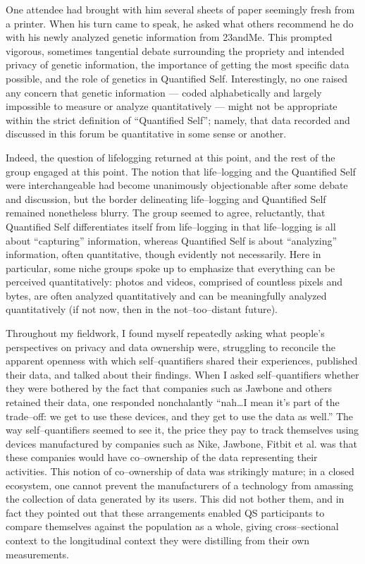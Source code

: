 \documentclass{article}
\begin{document}
One attendee had brought with him several sheets of paper seemingly fresh from a printer.
When his turn came to speak,
he asked what others recommend he do with his newly analyzed genetic information from 23andMe.
This prompted vigorous,
sometimes tangential debate surrounding the propriety and intended privacy of genetic information,
the importance of getting the most specific data possible,
and the role of genetics in Quantified Self.
Interestingly,
no one raised any concern that genetic information
--- coded alphabetically and largely impossible to measure or analyze quantitatively ---
might not be appropriate within the strict definition of ``Quantified Self'';
namely,
that data recorded and discussed in this forum be quantitative in some sense or another.

Indeed,
the question of lifelogging returned at this point,
and the rest of the group engaged at this point.
The notion that life--logging and the Quantified Self were interchangeable had become unanimously objectionable after some debate and discussion,
but the border delineating life--logging and Quantified Self remained nonetheless blurry.
The group seemed to agree,
reluctantly,
that Quantified Self differentiates itself from life--logging in that life--logging is all about ``capturing'' information,
whereas Quantified Self is about ``analyzing'' information,
often quantitative,
though evidently not necessarily.
Here in particular,
some niche groups spoke up to emphasize that everything can be perceived quantitatively:
photos and videos,
comprised of countless pixels and bytes,
are often analyzed quantitatively and can be meaningfully analyzed quantitatively (if not now,
then in the not--too--distant future).

Throughout my fieldwork,
I found myself repeatedly asking what people's perspectives on privacy and data ownership were,
struggling to reconcile the apparent openness with which self--quantifiers shared their experiences,
published their data,
and talked about their findings.
When I asked self--quantifiers whether they were bothered by the fact that companies such as Jawbone and others retained their data,
one responded nonchalantly ``nah\dots I mean it's part of the trade--off:
we get to use these devices,
and they get to use the data as well.'' The way self--quantifiers seemed to see it,
the price they pay to track themselves using devices manufactured by companies such as Nike,
Jawbone,
Fitbit et al.
was that these companies would have co--ownership of the data representing their activities.
This notion of co--ownership of data was strikingly mature;
in a closed ecosystem,
one cannot prevent the manufacturers of a technology from amassing the collection of data generated by its users.
This did not bother them,
and in fact they pointed out that these arrangements enabled QS participants to compare themselves against the population as a whole,
giving cross--sectional context to the longitudinal context they were distilling from their own measurements.
\end{document}
